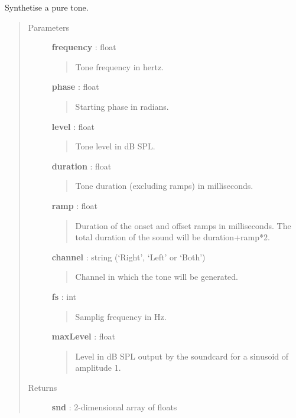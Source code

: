 \documentclass[a4paper,12pt,english]{sphinxmanual}
\begin{document}
\begin{fulllineitems}
\label{sndlib:sndlib.pureTone}
Synthetise a pure tone.
\begin{quote}\begin{description}
\item[{Parameters }] \leavevmode
\textbf{frequency} : float
\begin{quote}

Tone frequency in hertz.
\end{quote}

\textbf{phase} : float
\begin{quote}

Starting phase in radians.
\end{quote}

\textbf{level} : float
\begin{quote}

Tone level in dB SPL.
\end{quote}

\textbf{duration} : float
\begin{quote}

Tone duration (excluding ramps) in milliseconds.
\end{quote}

\textbf{ramp} : float
\begin{quote}

Duration of the onset and offset ramps in milliseconds.
The total duration of the sound will be duration+ramp*2.
\end{quote}

\textbf{channel} : string (`Right', `Left' or `Both')
\begin{quote}

Channel in which the tone will be generated.
\end{quote}

\textbf{fs} : int
\begin{quote}

Samplig frequency in Hz.
\end{quote}

\textbf{maxLevel} : float
\begin{quote}

Level in dB SPL output by the soundcard for a sinusoid of amplitude 1.
\end{quote}

\item[{Returns }] \leavevmode
\textbf{snd} : 2-dimensional array of floats
\begin{quote}


\end{quote}
\end{description}
\end{quote}
\end{fulllineitems}
\end{document}
